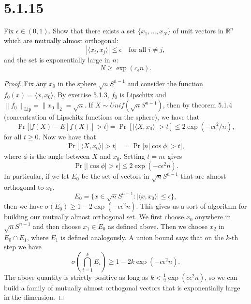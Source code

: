 \documentclass[11pt,letterpaper]{report}
\newcommand{\reals}{\mathbb{R}}
\newcommand{\Lip}[1]{\left\|{#1}\right\|_{\text{Lip}}}
\begin{document}
\section*{5.1.15}
Fix $\epsilon\in (0,1)$. Show that there exists a set $\{x_1, \ldots, x_N\}$ of unit vectors in $\reals^n$ which are mutually almost orthogonal:
\[
|\langle x_i, x_j\rangle| \leq \epsilon\quad\text{for all }i\neq j,
\]
and the set is exponentially large in $n$:
\[
N\geq \exp(c_\epsilon n).
\]
\begin{proof}
	Fix any $x_0$ in the sphere $\sqrt{n}S^{n-1}$ and consider the function $f_0(x) = \langle x, x_0\rangle$. By exercise 5.1.3, $f_0$ is Lipschitz and $\Lip{f_0} = \|x_0\|_2 = \sqrt{n}$. If $X\sim Unif(\sqrt{n}S^{n-1})$, then by theorem 5.1.4 (concentration of Lipschitz functions on the sphere), we have that
	\[
	\Pr\big[|f(X)-E[f(X)] > t\big] = \Pr[|\langle X, x_0\rangle| > t] \leq 2\exp(-ct^2/n),
	\]
	for all $t\geq 0$. Now we have that
	\begin{align*}
		\Pr\big[|\langle X, x_0\rangle| > t\big] &= \Pr\big[n|\cos \phi| > t\big],
	\end{align*}
	where $\phi$ is the angle between $X$ and $x_0$. Setting $t = n\epsilon$ gives
	\[
	\Pr\big[|\cos\phi|>\epsilon\big]\leq 2\exp(-c\epsilon^2n).
	\]
	In particular, if we let $E_0$ be the set of vectors in $\sqrt{n}S^{n-1}$ that are almost orthogonal to $x_0$,
	\[
	E_0 = \{x\in \sqrt{n}S^{n-1}: |\langle x, x_0\rangle|\leq \epsilon\},
	\]
	then we have $\sigma(E_0) \geq 1-2\exp(-c\epsilon^2 n)$. This gives us a sort of algorithm for building our mutually almost orthogonal set. We first choose $x_0$ anywhere in $\sqrt{n}S^{n-1}$ and then choose $x_1\in E_0$ as defined above. Then we choose $x_2$ in $E_0\cap E_1$, where $E_1$ is defined analogously. A union bound says that on the $k$-th step we have
	\[
	\sigma\left(\bigcap_{i=1}^kE_i\right) \geq 1-2k\exp(-c\epsilon^2n).
	\]
	The above quantity is strictly positive as long as $k<\frac{1}{2}\exp(c\epsilon^2n)$, so we can build a family of mutually almost orthogonal vectors that is exponentially large in the dimension.
\end{proof}
\end{document}
